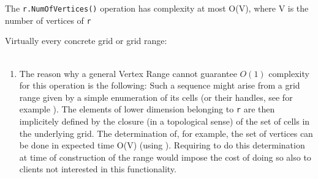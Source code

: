  The {\tt r.NumOfVertices()} operation has complexity at most O(V), where
 V is  the number of vertices of {\tt r} 
 
 Virtually every concrete grid  or grid range:
 \\
 \\
 
 \begin{enumerate}
 \item {}
   The reason why a general Vertex Range cannot guarantee $O(1)$ complexity for
   this operation is the following: 
   Such a sequence  might arise from a grid range
   given by a simple enumeration
   of its cells 
   (or their handles,
   see for example   ).
   The elements of lower dimension belonging to {\tt r} are then implicitely defined
   by the closure (in a topological sense) of the set of cells in the underlying grid.
   The determination of, for example, the set of vertices can be done in expected time
   O(V) (using ).
   Requiring to do this determination at time of construction of the range would 
   impose the cost of doing so also to clients not interested in this functionality.
 \end{enumerate}
  

